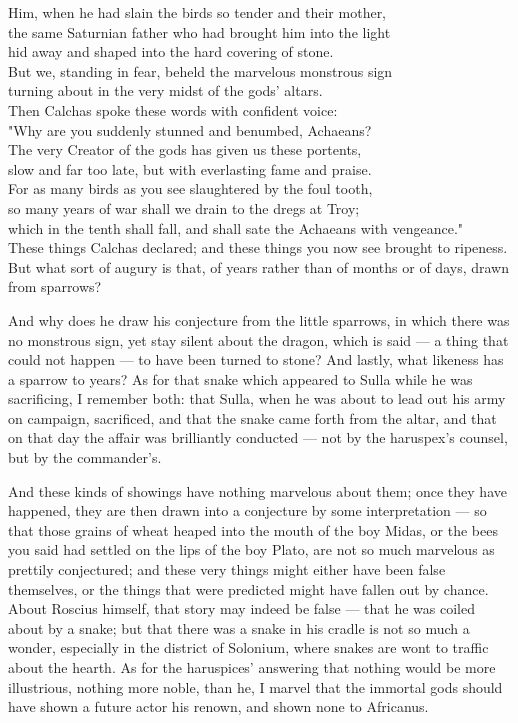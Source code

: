  Him, when he had slain the birds so tender and their mother, \\
the same Saturnian father who had brought him into the light \\
hid away and shaped into the hard covering of stone. \\
But we, standing in fear, beheld the marvelous monstrous sign \\
turning about in the very midst of the gods' altars. \\
Then Calchas spoke these words with confident voice: \\
"Why are you suddenly stunned and benumbed, Achaeans? \\
The very Creator of the gods has given us these portents, \\
slow and far too late, but with everlasting fame and praise. \\
For as many birds as you see slaughtered by the foul tooth, \\
so many years of war shall we drain to the dregs at Troy; \\
which in the tenth shall fall, and shall sate the Achaeans with vengeance." \\
These things Calchas declared; and these things you now see brought to ripeness. \\
But what sort of augury is that, of years rather than of months or of days, drawn from sparrows?

 And why does he draw his conjecture from the little sparrows, in which there was no monstrous sign, yet stay silent about the dragon, which is said — a thing that could not happen — to have been turned to stone? And lastly, what likeness has a sparrow to years? As for that snake which appeared to Sulla while he was sacrificing, I remember both: that Sulla, when he was about to lead out his army on campaign, sacrificed, and that the snake came forth from the altar, and that on that day the affair was brilliantly conducted — not by the haruspex's counsel, but by the commander's.

 And these kinds of showings have nothing marvelous about them; once they have happened, they are then drawn into a conjecture by some interpretation — so that those grains of wheat heaped into the mouth of the boy Midas, or the bees you said had settled on the lips of the boy Plato, are not so much marvelous as prettily conjectured; and these very things might either have been false themselves, or the things that were predicted might have fallen out by chance. About Roscius himself, that story may indeed be false — that he was coiled about by a snake; but that there was a snake in his cradle is not so much a wonder, especially in the district of Solonium, where snakes are wont to traffic about the hearth. As for the haruspices' answering that nothing would be more illustrious, nothing more noble, than he, I marvel that the immortal gods should have shown a future actor his renown, and shown none to Africanus.

